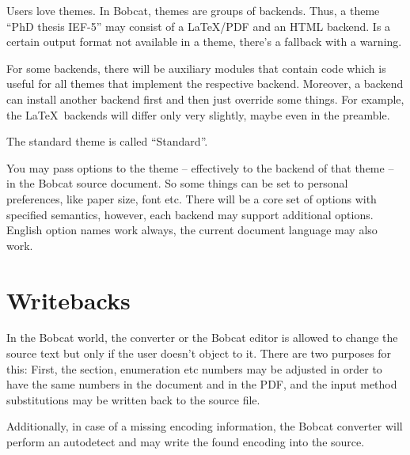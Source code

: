 \documentclass[12pt,openany]{book}
\begin{document}
Users love themes.  In Bobcat, themes are groups of backends.  Thus, a theme
``PhD thesis IEF-5'' may consist of a \LaTeX/PDF and an HTML backend.  Is a
certain output format not available in a theme, there's a fallback with a
warning.

For some backends, there will be auxiliary modules that contain code which
is useful for all themes that implement the respective backend.  Moreover, a
backend can install another backend first and then just override some things.
For example, the \LaTeX\ backends will differ only very slightly, maybe even in
the preamble.

The standard theme is called ``Standard''.

You may pass options to the theme -- effectively to the backend of that theme
-- in the Bobcat source document.  So some things can be set to personal
preferences, like paper size, font etc.  There will be a core set of options
with specified semantics, however, each backend may support additional
options.  English option names work always, the current document language may
also work.


\section{Writebacks}

In the Bobcat world, the converter or the Bobcat editor is allowed to change the
source text but only if the user doesn't object to it.  There are two purposes
for this: First, the section, enumeration etc numbers may be adjusted in order
to have the same numbers in the document and in the PDF, and the input method
substitutions may be written back to the source file.

Additionally, in case of a missing encoding information, the Bobcat converter
will perform an autodetect and may write the found encoding into the source.
\end{document}
